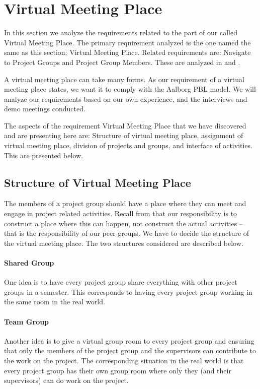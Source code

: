 \section{Virtual Meeting Place}
\label{sec:virtualMeetingPlace}
\label{sec:projectgroup}
In this section we analyze the requirements related to the part of our \subsystem{} called Virtual Meeting Place.
The primary requirement analyzed is the one named the same as this section; Virtual Meeting Place.
Related requirements are: Navigate to Project Groups and Project Group Members.
These are analyzed in  and .

A virtual meeting place can take many forms.
As our requirement of a virtual meeting place states, we want it to comply with the Aalborg PBL model.
We will analyze our requirements based on our own experience, and the interviews and demo meetings conducted.

The aspects of the requirement Virtual Meeting Place that we have discovered and are presenting here are: Structure of virtual meeting place, assignment of virtual meeting place, division of projects and groups, and interface of activities.
This are presented below.


\subsection{Structure of Virtual Meeting Place}
The members of a project group should have a place where they can meet and engage in project related activities.
Recall from  that our responsibility is to construct a place where this can happen, not construct the actual activities -- that is the responsibility of our peer-groups.
We have to decide the structure of the virtual meeting place.
The two structures considered are described below.

\paragraph{Shared Group} One idea is to have every project group share everything with other project groups in a semester.
This corresponds to having every project group working in the same room in the real world.

\paragraph{Team Group} Another idea is to give a virtual group room to every project group and ensuring that only the members of the project group and the supervisors can contribute to the work on the project.
The corresponding situation in the real world is that every project group has their own group room where only they (and their supervisors) can do work on the project. \\


